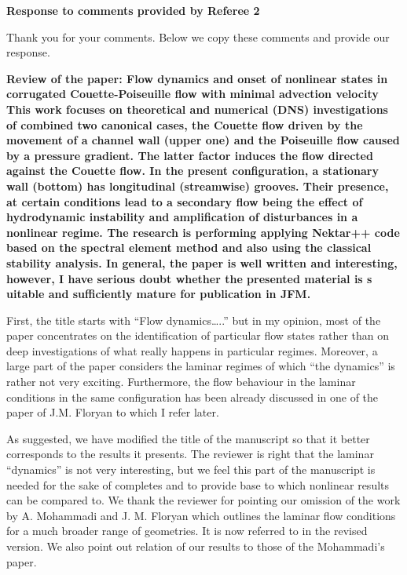 \documentclass[a4paper,12pt]{article}
\begin{document}
{\bf Response to comments provided by Referee 2}

Thank you for your comments. Below we copy these comments and provide our response. 

\vspace*{50pt}

{\bf Review of the paper: Flow dynamics and onset of nonlinear states in corrugated Couette-Poiseuille flow with minimal advection velocity This work focuses on theoretical and numerical (DNS) investigations of combined two canonical cases, the Couette flow driven by the movement of a channel wall (upper one) and the Poiseuille flow caused by a pressure gradient. The latter factor induces the flow directed against the Couette flow. In the present configuration, a stationary wall (bottom) has longitudinal (streamwise) grooves. Their presence, at certain conditions lead to a secondary flow being the effect of hydrodynamic instability and amplification of disturbances in a nonlinear regime. The research is performing applying Nektar++ code based on the spectral element method and also using the classical stability analysis. In general, the paper is well written and interesting, however, I have serious doubt whether the presented material is s uitable and sufficiently mature for publication in JFM. 

\vspace*{10pt}

First, the title starts with “Flow dynamics…..” but in my opinion, most of the paper concentrates on the identification of particular flow states rather than on deep investigations of what really happens in particular regimes. Moreover, a large part of the paper considers the laminar regimes of which “the dynamics” is rather not very exciting. Furthermore, the flow behaviour in the laminar conditions in the same configuration has been already discussed in one of the paper of J.M. Floryan to which I refer later.}

\vspace*{20pt}
As suggested, we have modified the title of the manuscript so that it better corresponds to the results it presents. The reviewer is right that the laminar “dynamics” is not very interesting, but we feel this part of the manuscript is needed for the sake of completes and to provide base to which nonlinear results can be compared to. We thank the reviewer for pointing our omission of the work by
A. Mohammadi and J. M. Floryan which outlines the laminar flow conditions for a much broader range of geometries. It is now referred to in the revised version. We also point out relation of our results to those of the Mohammadi’s paper.
\vspace*{20pt}
\end{document}
